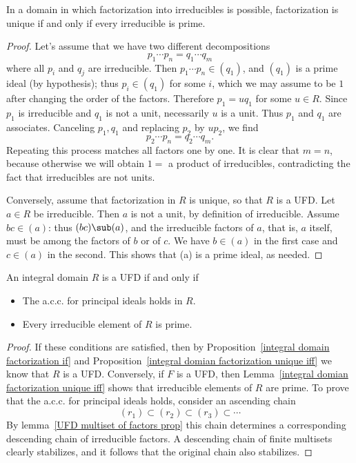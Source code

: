 \begin{proposition}\label{integral domian factorization unique iff}
In a domain in which factorization into irreducibles is possible, factorization is unique if and only if every irreducible is prime.
\end{proposition}
\begin{proof}
Let's assume that we have two different decompositions
\[p_1\cdots p_n=q_1\cdots q_m\]
where all $p_i$ and $q_j$ are irreducible. Then $p_1\cdots p_n\in(q_1)$, and $(q_1)$ is a prime ideal (by hypothesis); thus $p_i\in(q_1)$ for some $i$, which we may assume to be $1$ after changing the order of the factors. Therefore $p_1=uq_1$ for some $u\in R$. Since $p_1$ is irreducible and $q_1$ is not a unit, necessarily $u$ is a unit. Thus $p_1$ and $q_1$ are associates. Canceling $p_1,q_1$ and replacing $p_2$ by $up_2$, we find
\[p_2\cdots p_n=q_2\cdots q_m.\]
Repeating this process matches all factors one by one. It is clear that $m=n$, because otherwise we will obtain $1=$ a product of irreducibles, contradicting the fact that irreducibles are not units.\par
Conversely, assume that factorization in $R$ is unique, so that $R$ is a UFD. Let $a\in R$ be irreducible. Then $a$ is not a unit, by definition of irreducible. Assume $bc\in (a)$: thus $(bc)\sub(a)$, and the irreducible factors of $a$, that is, $a$ itself, must be among the factors of $b$ or of $c$. We have $b\in (a)$ in the first case and $c\in (a)$ in the second. This shows that (a) is a prime ideal, as needed.
\end{proof}
\begin{theorem}\label{integral domian is UFD iff}
An integral domain $R$ is a UFD if and only if
\begin{itemize}
\item The a.c.c. for principal ideals holds in $R$.
\item Every irreducible element of $R$ is prime.
\end{itemize}
\end{theorem}
\begin{proof}
If these conditions are satisfied, then by Proposition~\ref{integral domain factorization if} and Proposition~\ref{integral domian factorization unique iff} we know that $R$ is a UFD. Conversely, if $F$ is a UFD, then Lemma~\ref{integral domian factorization unique iff} shows that irreducible elements of $R$ are prime. To prove that the a.c.c. for principal ideals holds, consider an ascending chain
\[(r_1)\subset(r_2)\subset(r_3)\subset\cdots\]
By lemma~\ref{UFD multiset of factors prop} this chain determines a corresponding descending chain of irreducible factors. A descending chain of finite multisets clearly stabilizes, and it follows that the original chain also stabilizes.
\end{proof}
